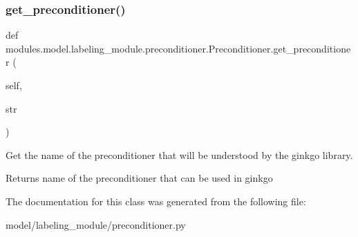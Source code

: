 \subsubsection{\texorpdfstring{get\+\_\+preconditioner()}{get\_preconditioner()}}
{\footnotesize\ttfamily def modules.\+model.\+labeling\+\_\+module.\+preconditioner.\+Preconditioner.\+get\+\_\+preconditioner (\begin{DoxyParamCaption}\item[{}]{self,  }\item[{}]{str }\end{DoxyParamCaption})}



Get the name of the preconditioner that will be understood by the ginkgo library. 

\begin{DoxyReturn}{Returns}
name of the preconditioner that can be used in ginkgo 
\end{DoxyReturn}


The documentation for this class was generated from the following file\+:\begin{DoxyCompactItemize}
\item 
model/labeling\+\_\+module/preconditioner.\+py\end{DoxyCompactItemize}
